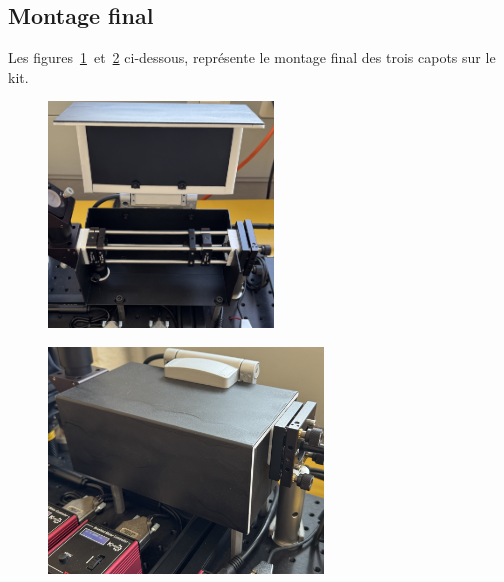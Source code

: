 \begin{minipage}{\textwidth}
    \subsection{Montage final} \label{montage_final}
    Les figures~\ref{montage_alu_ouvert}~et~\ref{montage_alu_ferme} ci-dessous, représente le montage final des trois capots sur le kit.
    \vspace{1em}

    \begin{minipage}[c]{0.48\textwidth}
        \begin{figure}[H]
            \begin{center}
                \includegraphics[height=6cm]{assets/figures/Protections_laser/Securite_mecanique/Protection_entree_laser/montage_alu_ouvert.jpeg}
            \end{center}
            \label{montage_alu_ouvert}
        \end{figure}
    \end{minipage}
    \begin{minipage}[r]{0.48\textwidth}
        \begin{figure}[H]
            \begin{center}
                \includegraphics[height=6cm]{assets/figures/Protections_laser/Securite_mecanique/Protection_entree_laser/montage_alu_ferme.jpeg}
            \end{center}
            \label{montage_alu_ferme}
        \end{figure}
    \end{minipage}
\end{minipage}

